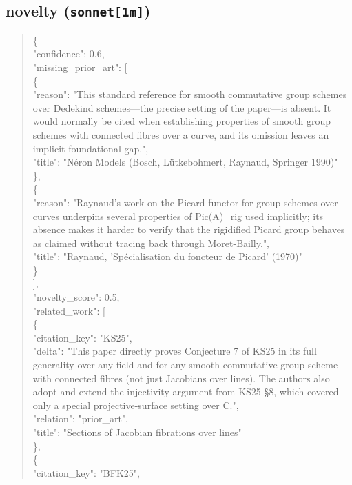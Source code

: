 \documentclass[11pt]{article}
\begin{document}
\subsection*{novelty (\texttt{sonnet[1m]})}
\begin{quote}\small\ttfamily\raggedright
\{\\
  "confidence": 0.6,\\
  "missing\_prior\_art": [\\
    \{\\
      "reason": "This standard reference for smooth commutative group schemes over Dedekind schemes---the precise setting of the paper---is absent. It would normally be cited when establishing properties of smooth group schemes with connected fibres over a curve, and its omission leaves an implicit foundational gap.",\\
      "title": "Néron Models (Bosch, Lütkebohmert, Raynaud, Springer 1990)"\\
    \},\\
    \{\\
      "reason": "Raynaud's work on the Picard functor for group schemes over curves underpins several properties of Pic(A)\_rig used implicitly; its absence makes it harder to verify that the rigidified Picard group behaves as claimed without tracing back through Moret-Bailly.",\\
      "title": "Raynaud, 'Spécialisation du foncteur de Picard' (1970)"\\
    \}\\
  ],\\
  "novelty\_score": 0.5,\\
  "related\_work": [\\
    \{\\
      "citation\_key": "KS25",\\
      "delta": "This paper directly proves Conjecture 7 of KS25 in its full generality over any field and for any smooth commutative group scheme with connected fibres (not just Jacobians over lines). The authors also adopt and extend the injectivity argument from KS25 §8, which covered only a special projective-surface setting over C.",\\
      "relation": "prior\_art",\\
      "title": "Sections of Jacobian fibrations over lines"\\
    \},\\
    \{\\
      "citation\_key": "BFK25",\\

\end{quote}
\end{document}
